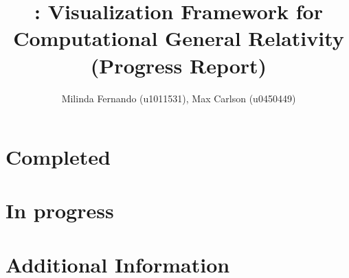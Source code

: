 \documentclass[a4paper,10pt]{article}
\title{\grvis : Visualization Framework for Computational General Relativity (Progress Report)}
\author{Milinda Fernando (u1011531), Max Carlson (u0450449)}
\begin{document}
\maketitle

\section{Completed}


\section{In progress}


\section{Additional Information}



\end{document}
